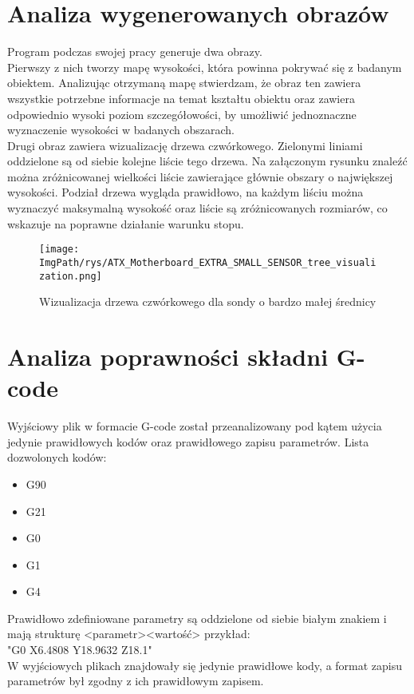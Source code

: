\documentclass[a4paper,12pt,twoside,openany]{report}
\newcommand{\ImgPath}{.}
\begin{document}
  \section{Analiza wygenerowanych obrazów}
    Program podczas swojej pracy generuje dwa obrazy.\\
    Pierwszy z nich tworzy mapę wysokości, która powinna pokrywać się z badanym obiektem. Analizując otrzymaną mapę stwierdzam, że obraz ten zawiera wszystkie potrzebne 
    informacje na temat kształtu obiektu oraz zawiera odpowiednio wysoki poziom szczegółowości, by umożliwić jednoznaczne wyznaczenie wysokości w badanych obszarach. \\
    Drugi obraz zawiera wizualizację drzewa czwórkowego. Zielonymi liniami oddzielone są od siebie kolejne liście tego drzewa. Na załączonym rysunku znaleźć można zróżnicowanej 
    wielkości liście zawierające głównie obszary o największej wysokości. Podział drzewa wygląda prawidłowo, na każdym liściu można wyznaczyć maksymalną wysokość oraz liście 
    są zróżnicowanych rozmiarów, co wskazuje na poprawne działanie warunku stopu.\\
    \begin{figure}[!htbp]
      \begin{center}
    \centering
    \texttt{[image: \\ImgPath/rys/ATX\_Motherboard\_EXTRA\_SMALL\_SENSOR\_tree\_visualization.png]}
    \end{center}
      \caption{Wizualizacja drzewa czwórkowego dla sondy o bardzo małej średnicy}
      \label{ATXStmap}
    \end{figure}
    \clearpage
  \section{Analiza poprawności składni G-code}
    Wyjściowy plik w formacie G-code został przeanalizowany pod kątem użycia jedynie prawidłowych kodów oraz prawidłowego zapisu parametrów. Lista dozwolonych kodów: 
    \begin{itemize}
      \item G90
      \item G21
      \item G0
      \item G1
      \item G4
    \end{itemize}
    Prawidłowo zdefiniowane parametry są oddzielone od siebie białym znakiem i mają strukturę <parametr><wartość> przykład: \\
    "G0 X6.4808 Y18.9632 Z18.1"\\
    W wyjściowych plikach znajdowały się jedynie prawidłowe kody, a format zapisu parametrów był zgodny z ich prawidłowym zapisem.
\end{document}

